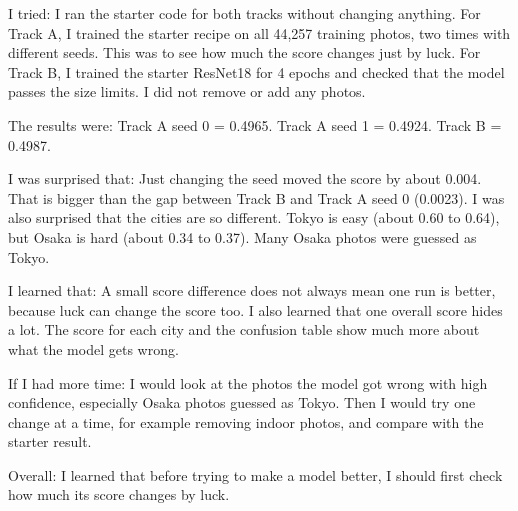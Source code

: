 \documentclass[11pt]{article}
\begin{document}
\makeheader

I tried:
I ran the starter code for both tracks without changing anything. For Track A, I trained the starter recipe on all 44,257 training photos, two times with different seeds. This was to see how much the score changes just by luck. For Track B, I trained the starter ResNet18 for 4 epochs and checked that the model passes the size limits. I did not remove or add any photos.

The results were:
Track A seed 0 = 0.4965.
Track A seed 1 = 0.4924.
Track B = 0.4987.

I was surprised that:
Just changing the seed moved the score by about 0.004. That is bigger than the gap between Track B and Track A seed 0 (0.0023). I was also surprised that the cities are so different. Tokyo is easy (about 0.60 to 0.64), but Osaka is hard (about 0.34 to 0.37). Many Osaka photos were guessed as Tokyo.

I learned that:
A small score difference does not always mean one run is better, because luck can change the score too. I also learned that one overall score hides a lot. The score for each city and the confusion table show much more about what the model gets wrong.

If I had more time:
I would look at the photos the model got wrong with high confidence, especially Osaka photos guessed as Tokyo. Then I would try one change at a time, for example removing indoor photos, and compare with the starter result.

Overall:
I learned that before trying to make a model better, I should first check how much its score changes by luck.

\figurepages
\end{document}

